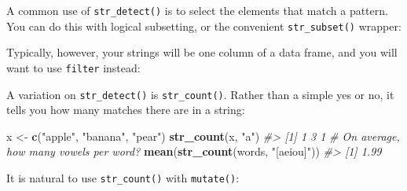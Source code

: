 \documentclass[]{book}
\newenvironment{Shaded}{\begin{snugshade}}{\end{snugshade}}
\newcommand{\KeywordTok}[1]{\textcolor[rgb]{0.13,0.29,0.53}{\textbf{#1}}}
\newcommand{\DataTypeTok}[1]{\textcolor[rgb]{0.13,0.29,0.53}{#1}}
\newcommand{\StringTok}[1]{\textcolor[rgb]{0.31,0.60,0.02}{#1}}
\newcommand{\CommentTok}[1]{\textcolor[rgb]{0.56,0.35,0.01}{\textit{#1}}}
\newcommand{\OperatorTok}[1]{\textcolor[rgb]{0.81,0.36,0.00}{\textbf{#1}}}
\newcommand{\NormalTok}[1]{#1}
\begin{document}
A common use of \texttt{str\_detect()} is to select the elements that
match a pattern. You can do this with logical subsetting, or the
convenient \texttt{str\_subset()} wrapper:

\begin{Shaded}
\end{Shaded}

Typically, however, your strings will be one column of a data frame, and
you will want to use \texttt{filter} instead:

\begin{Shaded}
\end{Shaded}

A variation on \texttt{str\_detect()} is \texttt{str\_count()}. Rather
than a simple yes or no, it tells you how many matches there are in a
string:

\begin{Shaded}
\begin{Highlighting}[]
\NormalTok{x <-}\StringTok{ }\KeywordTok{c}\NormalTok{(}\StringTok{"apple"}\NormalTok{, }\StringTok{"banana"}\NormalTok{, }\StringTok{"pear"}\NormalTok{)}
\KeywordTok{str_count}\NormalTok{(x, }\StringTok{"a"}\NormalTok{)}
\CommentTok{#> [1] 1 3 1}
\CommentTok{# On average, how many vowels per word?}
\KeywordTok{mean}\NormalTok{(}\KeywordTok{str_count}\NormalTok{(words, }\StringTok{"[aeiou]"}\NormalTok{))}
\CommentTok{#> [1] 1.99}
\end{Highlighting}
\end{Shaded}

It is natural to use \texttt{str\_count()} with \texttt{mutate()}:
\end{document}
